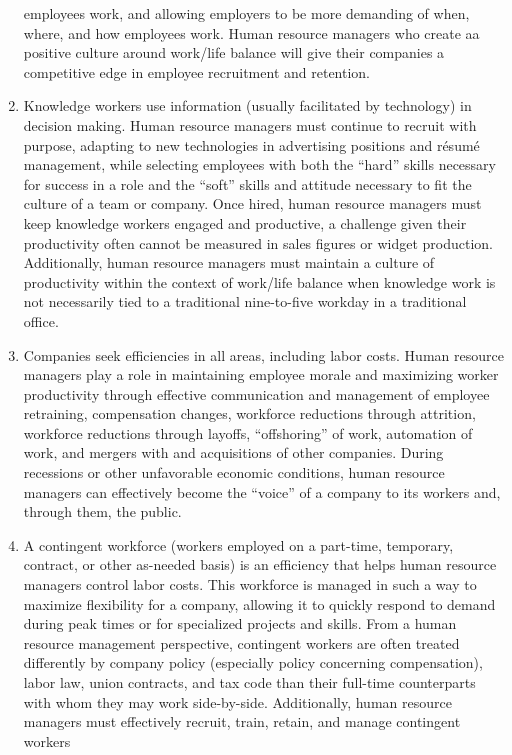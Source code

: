 \documentclass[12pt,apa,article,oneside,strict,titlepage]{eyered}
\begin{document}
\begin{enumerate}
  employees work, and allowing employers to be more demanding of when,
  where, and how employees work. Human resource managers who create aa
  positive culture around work/life balance will give their companies a
  competitive edge in employee recruitment and retention.
\item
  Knowledge workers use information (usually facilitated by technology)
  in decision making. Human resource managers must continue to recruit
  with purpose, adapting to new technologies in advertising positions
  and résumé management, while selecting employees with both the
  ``hard'' skills necessary for success in a role and the ``soft''
  skills and attitude necessary to fit the culture of a team or company.
  Once hired, human resource managers must keep knowledge workers
  engaged and productive, a challenge given their productivity often
  cannot be measured in sales figures or widget production.
  Additionally, human resource managers must maintain a culture of
  productivity within the context of work/life balance when knowledge
  work is not necessarily tied to a traditional nine-to-five workday in
  a traditional office.
\item
  Companies seek efficiencies in all areas, including labor costs. Human
  resource managers play a role in maintaining employee morale and
  maximizing worker productivity through effective communication and
  management of employee retraining, compensation changes, workforce
  reductions through attrition, workforce reductions through layoffs,
  ``offshoring'' of work, automation of work, and mergers with and
  acquisitions of other companies. During recessions or other
  unfavorable economic conditions, human resource managers can
  effectively become the ``voice'' of a company to its workers and,
  through them, the public.
\item
  A contingent workforce (workers employed on a part-time, temporary,
  contract, or other as-needed basis) is an efficiency that helps human
  resource managers control labor costs. This workforce is managed in
  such a way to maximize flexibility for a company, allowing it to
  quickly respond to demand during peak times or for specialized
  projects and skills. From a human resource management perspective,
  contingent workers are often treated differently by company policy
  (especially policy concerning compensation), labor law, union
  contracts, and tax code than their full-time counterparts with whom
  they may work side-by-side. Additionally, human resource managers must
  effectively recruit, train, retain, and manage contingent workers

\end{enumerate}
\end{document}
